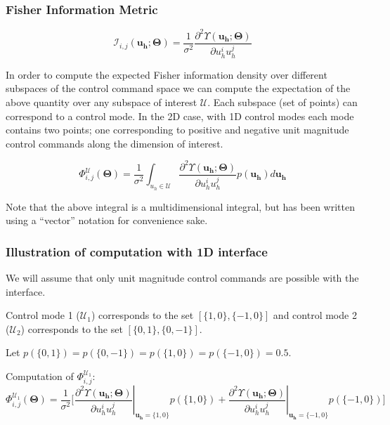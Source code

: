 \documentclass[]{article}
\begin{document}
\subsubsection*{Fisher Information Metric}
\begin{equation*}
\mathcal{I}_{i,j}(\boldsymbol{u_h}; \boldsymbol{\Theta}) = \frac{1}{\sigma^2}\frac{\partial^2\Upsilon(\boldsymbol{u_h};\boldsymbol{\Theta})}{\partial u_h^iu_h^j}
\end{equation*}

In order to compute the expected Fisher information density over different subspaces of the control command space we can compute the expectation of the above quantity over any subspace of interest $\mathcal{U}$. Each subspace (set of points) can correspond to a control mode. In the 2D case, with 1D control modes each mode contains two points; one corresponding to positive and negative unit magnitude control commands along the dimension of interest. 

\begin{equation*}
\Phi^{\mathcal{U}}_{i,j}(\boldsymbol{\Theta}) = \frac{1}{\sigma^2}\int_{u_{h} \in \mathcal{U}}\frac{\partial^2\Upsilon(\boldsymbol{u_h}; \boldsymbol{\Theta})}{\partial u_h^iu_h^j}p(\boldsymbol{u_h})d\boldsymbol{u_h}
\end{equation*}

Note that the above integral is a multidimensional integral, but has been written using a ``vector'' notation for convenience sake. 

\subsubsection*{Illustration of computation with 1D interface}

We will assume that only unit magnitude control commands are possible with the interface.

\noindent Control mode 1 ($\mathcal{U}_1$) corresponds to the set $[\{1,0\}, \{-1,0\}]$ and control mode 2 ($\mathcal{U}_2$) corresponds to the set $[\{0,1\}, \{0,-1\}]$. 

\noindent Let $p(\{0,1\}) = p(\{0,-1\}) = p(\{1,0\}) = p(\{-1,0\}) = 0.5$. 

\noindent Computation of $\Phi^{\mathcal{U}_1}_{i,j}$:
\begin{equation*}
\Phi^{\mathcal{U}_1}_{i,j}(\boldsymbol{\Theta}) = \frac{1}{\sigma^2}\Big[^{}\left.\frac{\partial^2\Upsilon(\boldsymbol{u_h}; \boldsymbol{\Theta})}{\partial u_h^iu_h^j}\right\vert_{\boldsymbol{u_h} = \{1,0\}}p(\{1,0\}) + \left.\frac{\partial^2\Upsilon(\boldsymbol{u_h}; \boldsymbol{\Theta})}{\partial u_h^iu_h^j}\right\vert_{\boldsymbol{u_h} = \{-1,0\}}p(\{-1,0\})\Big]
\end{equation*}
\end{document}

